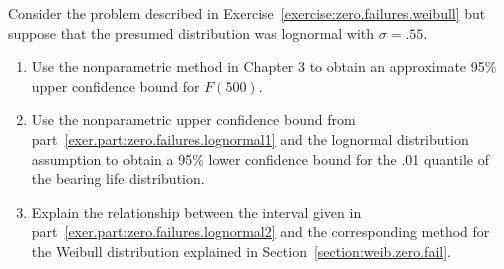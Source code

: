 \begin{exercise}
\label{exercise:zero.failures.lognormal}
Consider the problem described in
Exercise~\ref{exercise:zero.failures.weibull} but suppose that the
presumed distribution was lognormal with $\sigma=.55$.
\begin{enumerate}
\item
\label{exer.part:zero.failures.lognormal1}
Use the nonparametric method in Chapter 3 to obtain an approximate
95\% upper confidence
bound for $F(500)$.
\item 
\label{exer.part:zero.failures.lognormal2}
Use the nonparametric upper confidence bound from
part~\ref{exer.part:zero.failures.lognormal1} 
and the lognormal distribution assumption to obtain a 95\% lower
confidence bound for the .01 quantile of the bearing life
distribution.
\item
Explain the relationship between the interval given in
part~\ref{exer.part:zero.failures.lognormal2} and the corresponding
method for the Weibull distribution explained in
Section~\ref{section:weib.zero.fail}.
\end{enumerate}
\end{exercise}
